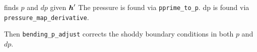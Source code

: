 finds $p$ and $dp$ given $\boldsymbol{h}'$
The pressure is found via \texttt{pprime\_to\_p}. dp is found via
\texttt{pressure\_map\_derivative}.

Then \texttt{bending\_p\_adjust} corrects the shoddy boundary conditions
in both $p$ and $dp$.
